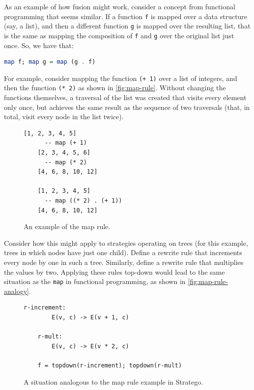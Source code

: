 As an example of how fusion might work, consider a concept from functional programming that seems similar. If a function \texttt{f} is mapped over a data structure (say, a list), and then a different function \texttt{g} is mapped over the resulting list, that is the same as mapping the composition of \texttt{f} and \texttt{g} over the original list just once. So, we have that:

\begin{lstlisting}[language=Haskell, otherkeywords={=, .}]
    map f; map g = map (g . f)
\end{lstlisting}

\noindent For example, consider mapping the function \texttt{(+ 1)} over a list of integers, and then the function \texttt{(* 2)} as shown in \autoref{fig:map-rule}. Without changing the functions themselves, a traversal of the list was created that visits every element only once, but achieves the same result as the sequence of two traversals (that, in total, visit every node in the list twice).

\begin{figure}
\begin{lstlisting}[style = mystyle_map_rule_haskell]
    [1, 2, 3, 4, 5]
      -- map (+ 1)
    [2, 3, 4, 5, 6]
      -- map (* 2)
    [4, 6, 8, 10, 12]

    [1, 2, 3, 4, 5]
      -- map ((* 2) . (+ 1))
    [4, 6, 8, 10, 12]
\end{lstlisting}
\caption{An example of the map rule.}
\label{fig:map-rule}
\end{figure}

Consider how this might apply to strategies operating on trees (for this example, trees in which nodes have just one child). Define a rewrite rule that increments every node by one in such a tree. Similarly, define a rewrite rule that multiplies the values by two. Applying these rules top-down would lead to the same situation as the \texttt{map} in functional programming, as shown in \autoref{fig:map-rule-analogy}.

\begin{figure}
\begin{lstlisting}[style = mystyle_map_rule_stratego]
    r-increment:
        E(v, c) -> E(v + 1, c)

    r-mult:
        E(v, c) -> E(v * 2, c)

    f = topdown(r-increment); topdown(r-mult)
\end{lstlisting}
\caption{A situation analogous to the map rule example in Stratego.}
\label{fig:map-rule-analogy}
\end{figure}

